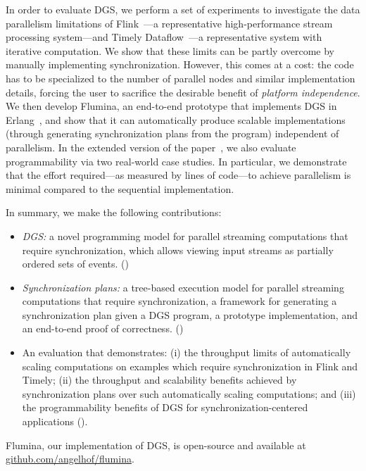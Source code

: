 In order to evaluate DGS, we perform a set of experiments to investigate the data parallelism limitations of Flink~\cite{Flink2015}---a representative high-performance stream processing system---and
Timely Dataflow~\cite{Naiad2013}---a representative system with iterative computation.
We show that these limits can be partly overcome by manually implementing synchronization. However, this comes at a cost: the code has to be specialized
to the number of parallel nodes and similar implementation details, forcing
the user to sacrifice the desirable benefit of \emph{platform independence}.
We then develop Flumina, an end-to-end prototype that implements DGS in Erlang~\cite{armstrong1993erlang}, and show that it can automatically produce scalable implementations (through generating synchronization plans from the program) independent of parallelism.
In the extended version of the paper~\cite{flumina-arxiv},
we also evaluate programmability via two real-world case studies.
In particular,
we demonstrate that the effort required---as measured by lines of code---to achieve parallelism is minimal compared to the sequential implementation.

In summary, we make the following contributions:
\begin{itemize}
\item
\emph{DGS:} a novel programming model for parallel streaming computations that require synchronization, which allows viewing input streams as partially ordered sets of events. ()
\item
\emph{Synchronization plans:} a tree-based execution model for parallel streaming computations that require synchronization, a framework for generating a synchronization plan given a DGS program, a prototype implementation, and an end-to-end proof of correctness.
()
\item
An evaluation that demonstrates: (i) the throughput limits of automatically scaling computations on examples which require synchronization in Flink and Timely; (ii) the throughput and scalability benefits achieved by synchronization plans over such automatically scaling computations; and (iii) the programmability benefits of DGS for synchronization-centered applications
().
\end{itemize}
Flumina, our implementation of DGS, is open-source and available
at \href{https://github.com/angelhof/flumina}{github.com/angelhof/flumina}.

